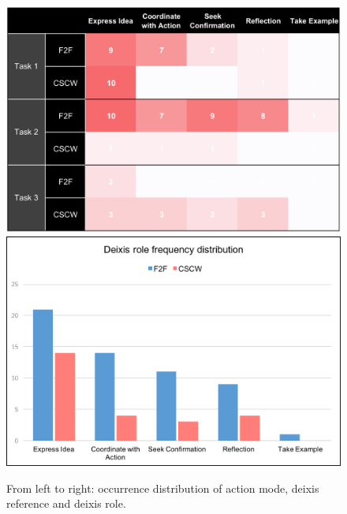 \documentclass[12pt,twoside]{article}
\begin{document}
\begin{figure}
\endminipage\hfill
{}%
  \includegraphics[width=\linewidth]{img/deixis_role_a.png}
  \includegraphics[width=\linewidth]{img/deixis_role_b.png}
\endminipage
\caption{From left to right: occurrence distribution of action mode, deixis reference and deixis role.}\label{fig:yumin}
\end{figure}
\end{document}
